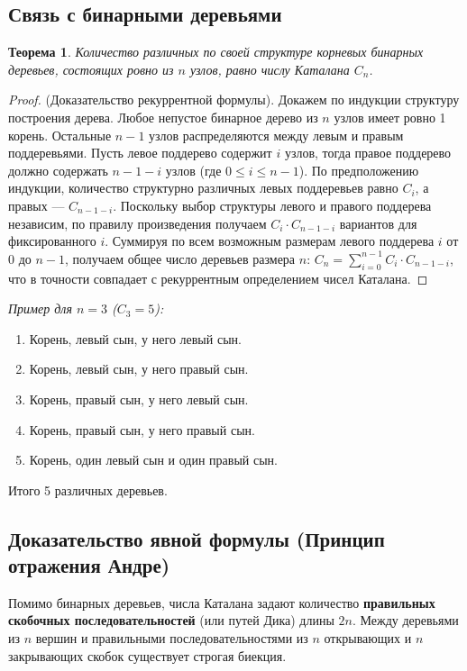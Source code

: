 \documentclass[12pt, a4paper]{article}
\newtheorem{theorem}{Теорема}
\begin{document}
\subsection{Связь с бинарными деревьями}
\begin{theorem}
Количество различных по своей структуре корневых бинарных деревьев, состоящих ровно из $n$ узлов, равно числу Каталана $C_n$.
\end{theorem}
\begin{proof}
(Доказательство рекуррентной формулы). Докажем по индукции структуру построения дерева. Любое непустое бинарное дерево из $n$ узлов имеет ровно 1 корень. Остальные $n-1$ узлов распределяются между левым и правым поддеревьями.
Пусть левое поддерево содержит $i$ узлов, тогда правое поддерево должно содержать $n-1-i$ узлов (где $0 \le i \le n-1$).
По предположению индукции, количество структурно различных левых поддеревьев равно $C_i$, а правых --- $C_{n-1-i}$. Поскольку выбор структуры левого и правого поддерева независим, по правилу произведения получаем $C_i \cdot C_{n-1-i}$ вариантов для фиксированного $i$.
Суммируя по всем возможным размерам левого поддерева $i$ от $0$ до $n-1$, получаем общее число деревьев размера $n$:
$C_n = \sum_{i=0}^{n-1} C_i \cdot C_{n-1-i}$,
что в точности совпадает с рекуррентным определением чисел Каталана.
\end{proof}
\textit{Пример для $n=3$ ($C_3=5$):}
\begin{enumerate}
    \item Корень, левый сын, у него левый сын.
    \item Корень, левый сын, у него правый сын.
    \item Корень, правый сын, у него левый сын.
    \item Корень, правый сын, у него правый сын.
    \item Корень, один левый сын и один правый сын.
\end{enumerate}
Итого 5 различных деревьев.

\subsection{Доказательство явной формулы (Принцип отражения Андре)}
Помимо бинарных деревьев, числа Каталана задают количество \textbf{правильных скобочных последовательностей} (или путей Дика) длины $2n$. Между деревьями из $n$ вершин и правильными последовательностями из $n$ открывающих и $n$ закрывающих скобок существует строгая биекция.
\end{document}
